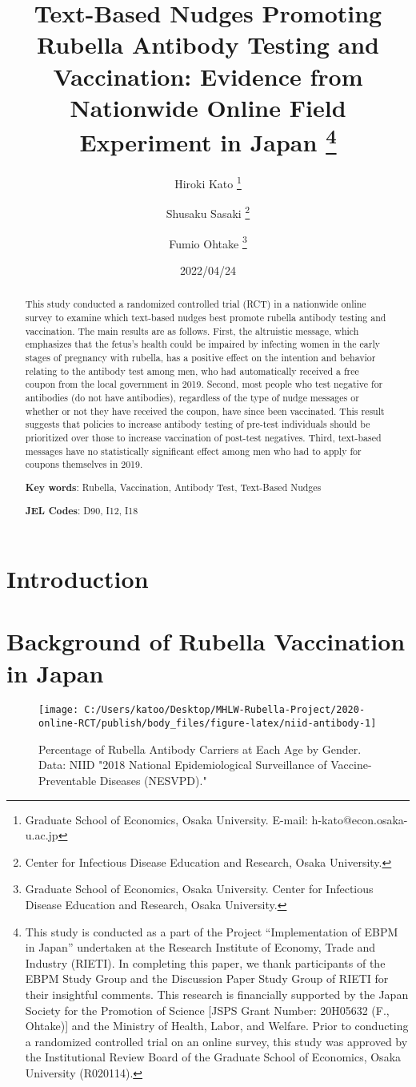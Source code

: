 \documentclass[
  11pt,
  a4paper,
]{article}
\title{Text-Based Nudges Promoting Rubella Antibody Testing and Vaccination:
Evidence from Nationwide Online Field Experiment in Japan  \thanks{This study is conducted as a part of the Project ``Implementation of EBPM in Japan''
undertaken at the Research Institute of Economy, Trade and Industry (RIETI).
In completing this paper,
we thank participants of the EBPM Study Group and
the Discussion Paper Study Group of RIETI for their insightful comments.
This research is financially supported by
the Japan Society for the Promotion of Science
{[}JSPS Grant Number: 20H05632 (F., Ohtake){]}
and the Ministry of Health, Labor, and Welfare.
Prior to conducting a randomized controlled trial on an online survey,
this study was approved by the Institutional Review Board
of the Graduate School of Economics, Osaka University (R020114).}  }
\author{
    Hiroki Kato
  \thanks{Graduate School of Economics, Osaka University. E-mail: h-kato@econ.osaka-u.ac.jp  }
  \and
    Shusaku Sasaki
  \thanks{Center for Infectious Disease Education and Research, Osaka University.  }
  \and
    Fumio Ohtake
  \thanks{Graduate School of Economics, Osaka University.
Center for Infectious Disease Education and Research, Osaka University.  }
  \and
  }
\date{2022/04/24}
\begin{document}
\begin{spacing}{1}
  \maketitle
\end{spacing}
\begin{spacing}{1}
  \begin{abstract}
    This study conducted a randomized controlled trial (RCT) in a nationwide online survey
    to examine which text-based nudges best promote rubella antibody testing and vaccination.
    The main results are as follows.
    First, the altruistic message,
    which emphasizes that the fetus's health could be impaired by
    infecting women in the early stages of pregnancy with rubella,
    has a positive effect on the intention and behavior relating to the antibody test among men,
    who had automatically received a free coupon from the local government in 2019.
    Second, most people who test negative for antibodies (do not have antibodies),
    regardless of the type of nudge messages or whether or not they have received the coupon,
    have since been vaccinated.
    This result suggests that policies to increase antibody testing of pre-test individuals
    should be prioritized over those to increase vaccination of post-test negatives.
    Third, text-based messages have no statistically significant effect
    among men who had to apply for coupons themselves in 2019.
    
                \noindent
    \textbf{Key words}: Rubella, Vaccination, Antibody Test, Text-Based Nudges
        
        \noindent
    \textbf{JEL Codes}: D90, I12, I18
            
  \end{abstract}
\end{spacing}

\hypertarget{intro}{%
\section{Introduction}\label{intro}}

\hypertarget{background}{%
\section{Background of Rubella Vaccination in Japan}\label{background}}

\begin{figure}[t]
\texttt{[image: C:/Users/katoo/Desktop/MHLW-Rubella-Project/2020-online-RCT/publish/body\_files/figure-latex/niid-antibody-1]} \caption{Percentage of Rubella Antibody Carriers at Each Age by Gender. Data: NIID "2018 National Epidemiological Surveillance of Vaccine-Preventable Diseases (NESVPD)."}\label{fig:niid-antibody}
\end{figure}
\end{document}

